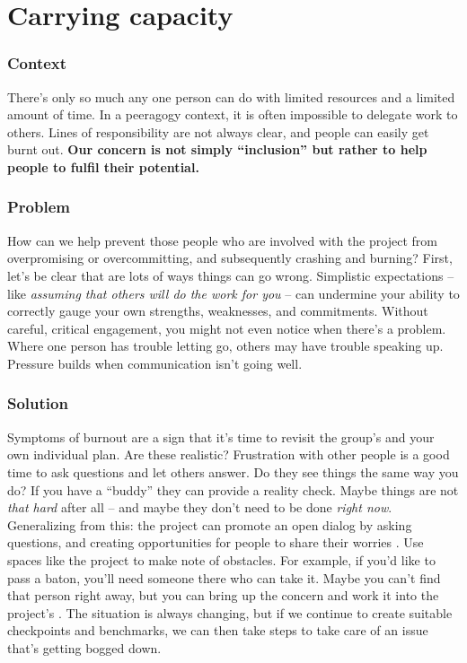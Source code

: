 \section{Carrying capacity}\label{sec:Carrying capacity}

\subsubsection*{Context}

There's only so much any one person can do with limited resources and a limited amount of time. In a peeragogy context, it is often impossible to delegate work to others.  Lines of responsibility are not always clear, and people can easily get burnt out. 
\textbf{Our concern is not simply ``inclusion'' but rather to help people to fulfil their potential.}

\subsubsection*{Problem}

How can we help prevent those people who are involved with the project from overpromising or overcommitting, and subsequently crashing and burning?  First, let's be clear that are lots of ways things can go wrong.  Simplistic expectations -- like \emph{assuming that others will do the work for you} \cite{torvalds-interview} -- can undermine your ability to correctly gauge your own strengths, weaknesses, and commitments.  Without careful, critical engagement, you might not even notice when there's a problem.  Where one person has trouble letting go, others may have trouble speaking up.  Pressure builds when communication isn't going well.  

\subsubsection*{Solution}

Symptoms of burnout are a sign that it's time to revisit the group's  and your own individual plan.  Are these realistic?  Frustration with other people is a good time to ask questions and let others answer.  Do they see things the same way you do?   If you have a ``buddy'' they can provide a reality check.   Maybe things are not \emph{that hard} after all -- and maybe they don't need to be done \emph{right now}.  Generalizing from this: the project can promote an open dialog by asking questions, and creating opportunities for people to share their worries \cite{seikkula2006dialogical}.  Use spaces like the project  to make note of obstacles.  For example, if you'd like to pass a baton, you'll need someone there who can take it.  Maybe you can't find that person right away, but you can bring up the concern and work it into the project's .  The situation is always changing, but if we continue to create suitable checkpoints and benchmarks, we can then take steps to take care of an issue that's getting bogged down.    

